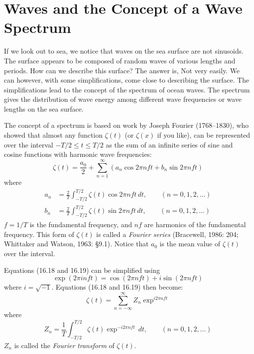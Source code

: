 \section{Waves and the Concept of a Wave Spectrum}
If we look out to sea, we notice that
waves on the sea surface are not sinusoids. The surface appears to be
composed of random waves of various lengths and periods. How can we
describe this surface? The answer is, Not very easily. We can however,
with some simplifications, come close to describing the surface. The
simplifications lead to the concept of the spectrum of ocean
waves. The spectrum gives the distribution of wave energy among
different wave frequencies or wave lengths on the sea surface.

The concept of a spectrum is based on work by Joseph Fourier
(1768--1830), who showed that almost any function $\zeta (t)$ (or
$\zeta (x)$ if you like), can be represented over the interval $-T/2
\le t \le T/2$ as the sum of an infinite series of sine and cosine
functions with harmonic wave frequencies:
\begin{equation}
\zeta (t) = \frac{a_0}{2} + \sum_{n=1}^{\infty} (a_n \cos 2\pi nft + b_n \sin
2\pi nft)
\end{equation}
where
\begin{subequations}
\begin{align}
a_n &= \frac{2}{T} \int_{-T/2}^{T/2} \zeta (t) \cos 2\pi nft \, dt, \qquad
(n=0,1,2,\ldots) \\
b_n &= \frac{2}{T} \int_{-T/2}^{T/2} \zeta (t) \sin 2\pi nft \, dt, \qquad
(n=0,1,2,\ldots)
\end{align}
\end{subequations}
$f = 1/ T$ is the fundamental frequency, and $nf$ are harmonics of the
fundamental frequency. This form of $\zeta (t)$ is called a
\textit{Fourier series} (Bracewell, 1986: 204;
Whittaker and Watson, 1963: \S 9.1). Notice that $a_0$ is the mean
value of $\zeta (t)$ over the interval.

Equations (16.18 and 16.19) can be simplified using
\begin{equation}
\exp (2\pi inft) = \cos (2\pi nft) + i \sin (2\pi nft)
\end{equation}
where $i = \sqrt{-1}$. Equations (16.18 and 16.19) then become:
\begin{equation}
\zeta (t) = \sum_{n=-\infty}^{\infty} Z_n \exp ^{i2\pi nft}
\end{equation}
where
\begin{equation}
Z_n = \frac{1}{T} \int_{-T/2}^{T/2} \zeta (t) \exp ^{-i2\pi nft} \, dt, \qquad
(n=0,1,2,\ldots)
\end{equation}
$Z_n$ is called the \textit{Fourier transform}  of $\zeta (t)$.

